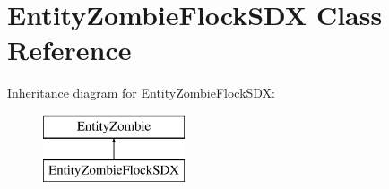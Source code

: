 \hypertarget{class_entity_zombie_flock_s_d_x}{}\section{Entity\+Zombie\+Flock\+S\+DX Class Reference}
\label{class_entity_zombie_flock_s_d_x}
Inheritance diagram for Entity\+Zombie\+Flock\+S\+DX\+:\begin{figure}[H]
\begin{center}
\leavevmode
\includegraphics[height=2.000000cm]{d9/db9/class_entity_zombie_flock_s_d_x}
\end{center}
\end{figure}
